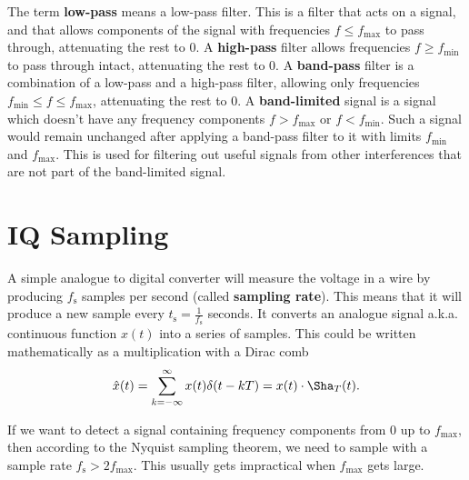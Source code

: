 \documentclass[a4paper,12pt,twoside,openright]{report}
\begin{document}
The term \textbf{low-pass} means a low-pass filter. This is a filter that acts on a signal, and that allows components of the signal with frequencies $f \leq f_\text{max}$ to pass through, attenuating the rest to 0. A \textbf{high-pass} filter allows frequencies $f \geq f_\text{min}$ to pass through intact, attenuating the rest to 0. A \textbf{band-pass} filter is a combination of a low-pass and a high-pass filter, allowing only frequencies $f_\text{min} \leq f \leq f_\text{max}$, attenuating the rest to 0. A \textbf{band-limited} signal is a signal which doesn't have any frequency components $f > f_\text{max}$ or $f < f_\text{min}$. Such a signal would remain unchanged after applying a band-pass filter to it with limits $f_\text{min}$ and $f_\text{max}$. This is used for filtering out useful signals from other interferences that are not part of the band-limited signal.

\section{IQ Sampling} 
\label{sec:IQSampling}

A simple analogue to digital converter will measure the voltage in a wire by producing $f_\text{s}$ samples per second (called \textbf{sampling rate}). This means that it will produce a new sample every $t_\text{s} = \frac{1}{f_\text{s}}$ seconds. It converts an analogue signal a.k.a. continuous function $x(t)$ into a series of samples. This could be written mathematically as a multiplication with a Dirac comb
\begin{equation}
\label{eq:sampling}
\hat{x}(t) = \sum_{k=-\infty}^{\infty} x(t) \delta(t - kT) = x(t) \cdot  \Sha_{T}(t).
\end{equation}

If we want to detect a signal containing frequency components from $0$ up to $f_\text{max}$, then according to the Nyquist sampling theorem, we need to sample with a sample rate $f_\text{s} > 2 f_\text{max}$. This usually gets impractical when $f_\text{max}$ gets large.
\end{document}
